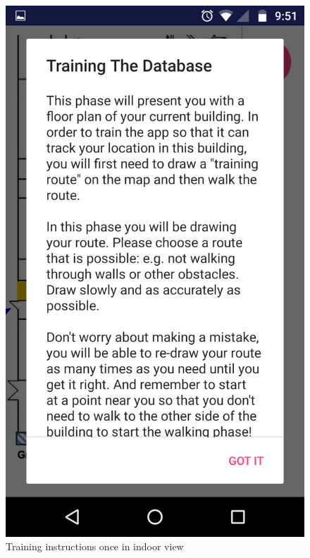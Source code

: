 \documentclass[10.8pt]{article}
\begin{document}
\begin{figure}[H]
    \centering
    \begin{minipage}[b]{.3\textwidth} 
        \centering  
        \includegraphics[scale=1.2, width=\linewidth]{pic3.png}     
        \caption{Training instructions once in indoor view}  
        \label{fig:1}
    \end{minipage}    
    \hfill
    \begin{minipage}[b]{.3\textwidth}  
        \centering  

\end{minipage}
\end{figure}
\end{document}
